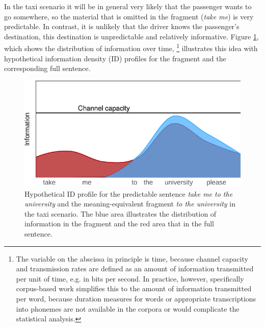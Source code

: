 In the taxi scenario it will be in general very likely that the passenger wants to go somewhere, so the material that is omitted in the fragment (\textit{take me}) is very predictable. In contrast, it is unlikely that the driver knows the passenger's destination, this destination is unpredictable and relatively informative. Figure \ref{fig:fragments-uid-predictable}, which shows the distribution of information over time,%
%
\footnote{The variable on the abscissa in principle is time, because channel capacity and transmission rates are defined as an amount of information transmitted per unit of time, e.g. in bits per second. In practice, however, specifically corpus-based work \citep[see e.g.][]{levy.jaeger2007, frank.jaeger2008, jaeger2010} simplifies this to the amount of information transmitted per word, because duration measures for words or appropriate transcriptions into phonemes are not available in the corpora or would complicate the statistical analysis.}\afterfn%
%
illustrates this idea with hypothetical information density (ID) profiles for the fragment and the corresponding full sentence. 

\begin{figure}[t]
\includegraphics[scale=1]{figures/uid-example-fragment}
 \caption{Hypothetical ID profile for the predictable sentence \textit{take me to the university} and the meaning-equivalent fragment \textit{to the university} in the taxi scenario. The blue area illustrates the distribution of information in the fragment and the red area that in the full sentence.\label{fig:fragments-uid-predictable}}
\end{figure}

